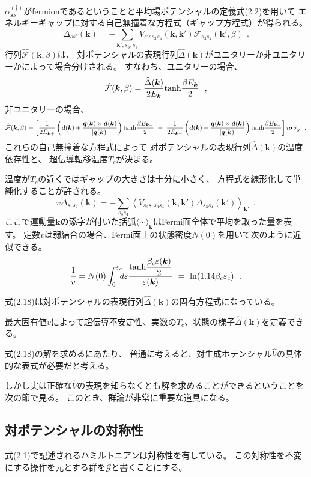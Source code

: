 \documentclass[uplatex,a4j,12pt,dvipdfmx]{jsarticle}
\begin{document}
$\alpha_{\bm{k}s}^{(\dagger)}$がfermionであるということと平均場ポテンシャルの定義式(2.2)を用いて
エネルギーギャップに対する自己無撞着な方程式（ギャップ方程式）が得られる。
\[
	\Delta_{ss'}(\bm{k})
	=
	- \sum_{\bm{k}',s_{3},s_{4}}
	V_{s' s s_{3} s_{4}}
	(\bm{k},\bm{k}')
	\mathcal{F}_{s_{3} s_{4}}(\bm{k}',\beta)
	\ \ .
\]
行列$\hat{\mathcal{F}}(\bm{k},\beta)$は、
対ポテンシャルの表現行列$\hat{\Delta}(\bm{k})$がユニタリーか非ユニタリーかによって場合分けされる。
すなわち、ユニタリーの場合、
\[
	\hat{\mathcal{F}}(\bm{k},\beta)
	=
	\dfrac{ \hat{\Delta}(\bm{k}) }{ 2 E_{\bm{k}} }
	{\rm tanh}\dfrac{\beta E_{\bm{k}}}{2}
	\ \ ,
\]
非ユニタリーの場合、
\[
	\hat{\mathcal{F}}(\bm{k},\beta)
	=
	\left[
		\dfrac{ 1 }{ 2 E_{\bm{k} +} }
		\left(
		\bm{d}(\bm{k})
		+
		\dfrac{\bm{q}(\bm{k}) \times \bm{d}(\bm{k})}{|\bm{q}(\bm{k})|}
		\right)
		{\rm tanh}\dfrac{\beta E_{\bm{k}+}}{2}
		\ + \
		\dfrac{ 1 }{ 2 E_{\bm{k} -} }
		\left(
		\bm{d}(\bm{k})
		-
		\dfrac{\bm{q}(\bm{k}) \times \bm{d}(\bm{k})}{|\bm{q}(\bm{k})|}
		\right)
		{\rm tanh}\dfrac{\beta E_{\bm{k}-}}{2}
		\right]
	i \hat{\bm{\sigma}} \hat{\sigma}_{y}
	\ \ .
\]
これらの自己無撞着な方程式によって
対ポテンシャルの表現行列$\hat{\Delta}(\bm{k})$の温度依存性と、
超伝導転移温度$T_{c}$が決まる。

温度が$T_{c}$の近くではギャップの大きさは十分に小さく、
方程式を線形化して単純化することが許される。
\[
	v \Delta_{s_{1} s_{2}}(\bm{k})
	=
	- \sum_{s_{3} s_{4}}
	\left\langle
	V_{ s_{2} s_{1} s_{3} s_{4} } (\bm{k} , \bm{k}')
	\Delta_{s_{3} s_{4}} (\bm{k}')
	\right\rangle_{\bm{k}'}
	\ \ .
\]
ここで運動量$\bm{k}$の添字が付いた括弧$\langle \cdots \rangle_{\bm{k}}$はFermi面全体で平均を取った量を表す。
定数$v$は弱結合の場合、Fermi面上の状態密度$N(0)$を用いて次のように近似できる。
\[
	\dfrac{1}{v}
	=
	N(0)
	\int^{\varepsilon_{c}}_{0}
	\!\!\! d \varepsilon
	\dfrac{{\rm tanh}\dfrac{\beta_{c} \varepsilon(\bm{k})}{2}}{\varepsilon(\bm{k})}
	\ = \
	{\rm ln}(1.14 \beta_{c} \varepsilon_{c})
	\ \ .
\]

式(2.18)は対ポテンシャルの表現行列$\hat{\Delta}(\bm{k})$の固有方程式になっている。

最大固有値$v$によって超伝導不安定性、実数の$T_{c}$、状態の様子$\hat{\Delta}(\bm{k})$を定義できる。

式(2.18)の解を求めるにあたり、
普通に考えると、対生成ポテンシャル$\hat{V}$の具体的な表式が必要だと考える。

しかし実は正確な$\hat{V}$の表現を知らなくとも解を求めることができるということを次の節で見る。
このとき、群論が非常に重要な道具になる。
\subsection{対ポテンシャルの対称性}
式(2.1)で記述されるハミルトニアンは対称性を有している。
この対称性を不変にする操作を元とする群を$\mathcal{G}$と書くことにする。
\end{document}
